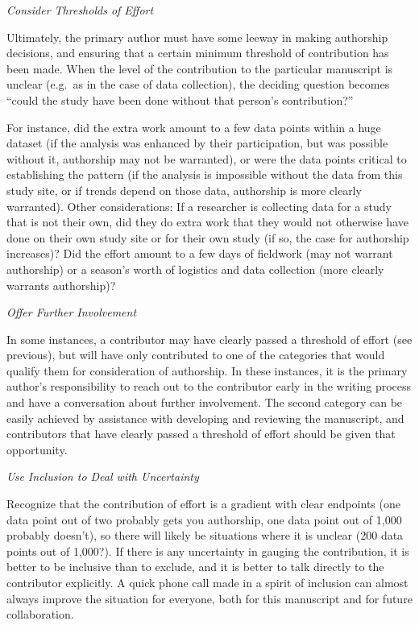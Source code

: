 \documentclass[]{article}
\begin{document}
\emph{Consider Thresholds of Effort}

Ultimately, the primary author must have some leeway in making
authorship decisions, and ensuring that a certain minimum threshold of
contribution has been made. When the level of the contribution to the
particular manuscript is unclear (e.g.~as in the case of data
collection), the deciding question becomes ``could the study have been
done without that person's contribution?''

For instance, did the extra work amount to a few data points within a
huge dataset (if the analysis was enhanced by their participation, but
was possible without it, authorship may not be warranted), or were the
data points critical to establishing the pattern (if the analysis is
impossible without the data from this study site, or if trends depend on
those data, authorship is more clearly warranted). Other considerations:
If a researcher is collecting data for a study that is not their own,
did they do extra work that they would not otherwise have done on their
own study site or for their own study (if so, the case for authorship
increases)? Did the effort amount to a few days of fieldwork (may not
warrant authorship) or a season's worth of logistics and data collection
(more clearly warrants authorship)?

\emph{Offer Further Involvement}

In some instances, a contributor may have clearly passed a threshold of
effort (see previous), but will have only contributed to one of the
categories that would qualify them for consideration of authorship. In
these instances, it is the primary author's responsibility to reach out
to the contributor early in the writing process and have a conversation
about further involvement. The second category can be easily achieved by
assistance with developing and reviewing the manuscript, and
contributors that have clearly passed a threshold of effort should be
given that opportunity.

\emph{Use Inclusion to Deal with Uncertainty}

Recognize that the contribution of effort is a gradient with clear
endpoints (one data point out of two probably gets you authorship, one
data point out of 1,000 probably doesn't), so there will likely be
situations where it is unclear (200 data points out of 1,000?). If there
is any uncertainty in gauging the contribution, it is better to be
inclusive than to exclude, and it is better to talk directly to the
contributor explicitly. A quick phone call made in a spirit of inclusion
can almost always improve the situation for everyone, both for this
manuscript and for future collaboration.
\end{document}
